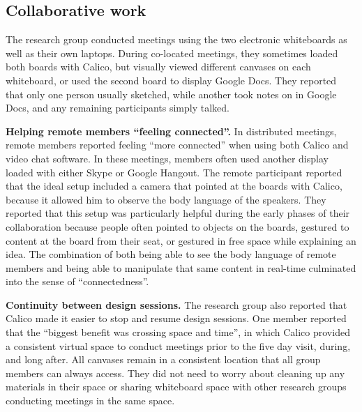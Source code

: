 \subsection{Collaborative work}

The research group conducted meetings using the two electronic whiteboards as well as their own laptops. During co-located meetings, they sometimes loaded both boards with Calico, but visually viewed different canvases on each whiteboard, or used the second board to display Google Docs. They reported that only one person usually sketched, while another took notes on in Google Docs, and any remaining participants simply talked. 


\textbf{Helping remote members ``feeling connected''.} In distributed meetings, remote members reported feeling ``more connected'' when using both Calico and video chat software. In these meetings, members often used another display loaded with either Skype or Google Hangout. The remote participant reported that the ideal setup included a camera that pointed at the boards with Calico, because it allowed him to observe the body language of the speakers. They reported that this setup was particularly helpful during the early phases of their collaboration because people often pointed to objects on the boards, gestured to content at the board from their seat, or gestured in free space while explaining an idea. The combination of both being able to see the body language of remote members and being able to manipulate that same content in real-time culminated into the sense of ``connectedness''.


\textbf{Continuity between design sessions.} The research group also reported that Calico made it easier to stop and resume design sessions. One member reported that the ``biggest benefit was crossing space and time'', in which Calico provided a consistent virtual space to conduct meetings prior to the five day visit, during, and long after. All canvases remain in a consistent location that all group members can always access. They did not need to worry about cleaning up any materials in their space or sharing whiteboard space with other research groups conducting meetings in the same space. 

